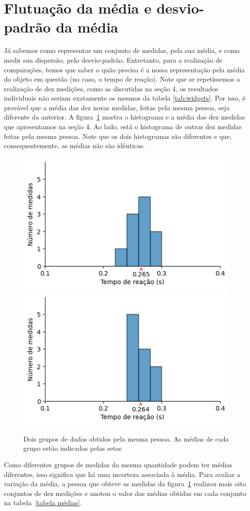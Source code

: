\documentclass[12pt, a4paper]{article}
\begin{document}
\section{Flutuação da média e desvio-padrão da média}

Já sabemos como representar um conjunto de medidas, pela sua média, e como medir sua dispersão, pelo desvio-padrão. Entretanto, para a realização de comparações, temos que saber o quão precisa é a nossa representação pela média do objeto em questão (no caso, o tempo de reação). Note que se repetíssemos a realização de dez medições, como as discutidas na seção 4, os resultados individuais não seriam exatamente os mesmos da tabela \ref{tab:widgets}. Por isso, é provável que a média das dez novas medidas, feitas pela mesma pessoa, seja diferente da anterior. A figura~\ref{duas tomadas} mostra o histograma e a média das dez medidas que apresentamos na seção 4. Ao lado, está o histograma de outras dez medidas feitas pela mesma pessoa. Note que os dois histogramas são diferentes e que, consequentemente, as médias não são idênticas.

\begin{figure}[H]
    \centering
    \includegraphics[width=0.48\linewidth]{histograma princ..png}
    \includegraphics[width=0.48\linewidth]{segunda tomada.png}
    \caption{ Dois grupos de dados obtidos pela mesma pessoa. As médias de cada grupo estão indicadas pelas setas}
    \label{duas tomadas}
\end{figure}

Como diferentes grupos de medidas da mesma quantidade podem ter médias diferentes, isso significa que há uma incerteza associada à média. Para avaliar a variação da média, a pessoa que obteve as medidas da figura~\ref{duas tomadas} realizou mais oito conjuntos de dez 
medições e anotou o valor das médias obtidas em cada conjunto na tabela~\ref{tabela médias}.
\end{document}
